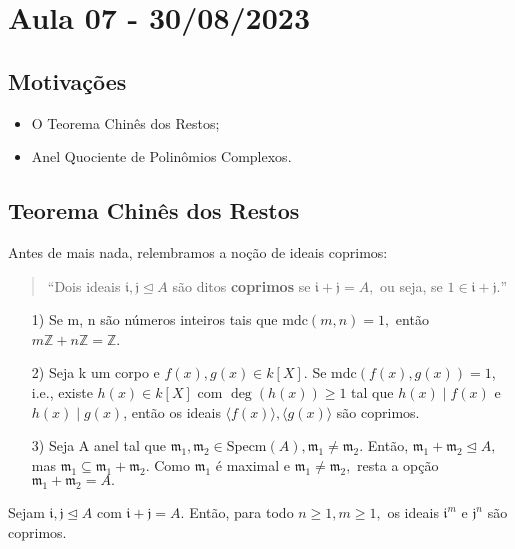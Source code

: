 \documentclass[AlgebraII/algebraII_notes.tex]{subfiles}
\begin{document}
\section{Aula 07 - 30/08/2023}
\subsection{Motivações}
\begin{itemize}
	\item O Teorema Chinês dos Restos;
	\item Anel Quociente de Polinômios Complexos.
\end{itemize}
\subsection{Teorema Chinês dos Restos}
Antes de mais nada, relembramos a noção de ideais coprimos:
\begin{quote}
	``Dois ideais \(\mathfrak{i}, \mathfrak{j}\trianglelefteq{A}\) são ditos \textbf{coprimos} se \(\mathfrak{i}+\mathfrak{j} = A,\) ou seja,
	se \(1\in \mathfrak{i}+\mathfrak{j}.\)''
\end{quote}
\begin{example}
	\begin{itemize}
		\item[1)] Se m, n são números inteiros tais que \(\mathrm{mdc}(m, n) = 1,\) então \(m \mathbb{Z} + n \mathbb{Z} = \mathbb{Z}\).
		\item[2)] Seja k um corpo e \(f(x), g(x)\in k[X].\) Se \(\mathrm{mdc}(f(x), g(x)) = 1\), i.e.,
		      existe \(h(x)\in k[X]\) com \(\deg(h(x))\geq 1\) tal que \(h(x)\mid f(x)\) e \(h(x)\mid g(x)\), então os ideais
		      \(\langle f(x) \rangle, \langle g(x) \rangle\) são coprimos.
		\item[3)] Seja A anel tal que \(\mathfrak{m}_{1}, \mathfrak{m}_{2}\in \mathrm{Specm}(A), \mathfrak{m}_{1}\neq \mathfrak{m}_{2}.\) Então,
		      \(\mathfrak{m}_{1} + \mathfrak{m}_{2} \trianglelefteq{A},\) mas \(\mathfrak{m}_1\subseteq \mathfrak{m}_{1}+\mathfrak{m}_{2}.\)
		      Como \(\mathfrak{m}_{1}\) é maximal e \(\mathfrak{m}_{1}\neq \mathfrak{m}_{2},\) resta a opção \(\mathfrak{m}_{1} + \mathfrak{m}_{2} = A.\)
	\end{itemize}
\end{example}
\begin{prop*}
	Sejam \(\mathfrak{i}, \mathfrak{j}\trianglelefteq{A}\) com \(\mathfrak{i}+\mathfrak{j} = A.\) Então, para todo \(n\geq 1, m\geq 1,\) os ideais
	\(\mathfrak{i}^{m}\) e \(\mathfrak{j}^{n}\) são coprimos.
\end{prop*}
\end{document}
